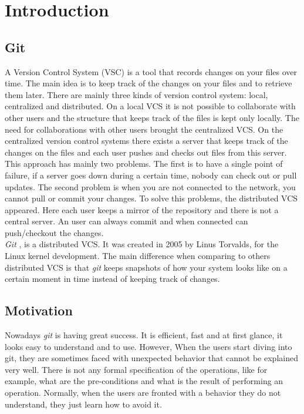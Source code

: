 \chapter{Introduction}
\section{Git}
A Version Control System (VSC) is a tool that records changes on your
files over time. The main idea is to keep track of the changes on your
files and to retrieve them later. There are mainly three kinds of 
version control system: local, centralized and distributed. On
a local VCS it is not possible to collaborate with other users and
the structure that keeps track of the files is kept only locally. The
need for collaborations with other users brought the centralized VCS.
On the centralized version control systems there exists a server that keeps
track of the changes on the files and each user pushes and checks out files
from this server. This approach has mainly two problems. The
first is to have a single point of failure, if a server goes down
during a certain time, nobody can check out or pull updates. The
second problem is when you are not connected to the network, you
cannot pull or commit your changes. To solve this problems, the
distributed VCS appeared. Here each user keeps a mirror of the
repository and there is not a central server. An user can always commit
and when connected can push/checkout the changes.\\

\emph{Git} \cite{progit}, \cite{gitComm} is a distributed VCS. It was created in 2005 by Linus Torvalds,
for the Linux kernel development. The main difference when comparing to
others distributed VCS is that \emph{git} keeps snapshots of how your system
looks like on a certain moment in time instead of keeping track of
changes.

\section{Motivation}
Nowadays \emph{git} is having great success. It is efficient, fast and
at first glance, it looks easy to understand and to use. However, When
the users start diving into git, they are sometimes faced with unexpected behavior that
cannot be explained very well. There is not any formal
specification of the operations, like for example, what are the pre-conditions and
what is the result of performing an operation. Normally, when the users
are fronted with a behavior they do not understand, they just learn how to avoid it.\\


